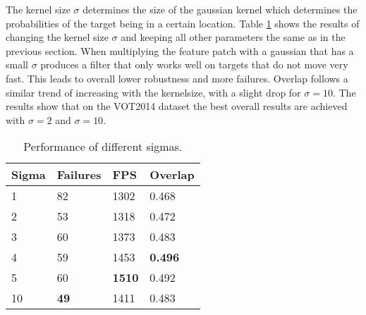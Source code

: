 \documentclass[9pt]{IEEEtran}
\begin{document}
The kernel size $\sigma$ determines the size of the gaussian kernel which determines the probabilities of the target being in a certain location.
Table \ref*{label:sigma} shows the results of changing the kernel size $\sigma$ and keeping all other parameters the same as in the previous section.
When multiplying the feature patch with a gaussian that has a small $\sigma$  produces a filter that only works well on targets that do not move very fast.
This leads to overall lower robustness and more failures.
Overlap follows a similar trend of increasing with the kernelsize, with a slight drop for $\sigma = 10$.
The results show that on the VOT2014 dataset the best overall results are achieved with $\sigma = 2$ and $\sigma = 10$.
\begin{table}[!ht]
    \centering
    \begin{tabular}{llll}
        \textbf{Sigma} & \textbf{Failures} & \textbf{FPS} & \textbf{Overlap} \\ \hline
        1 & 82 & 1302 & 0.468 \\ 
        2 & 53 & 1318 & 0.472 \\ 
        3 & 60 & 1373 & 0.483 \\ 
        4 & 59 & 1453 & \textbf{0.496} \\ 
        5 & 60 & \textbf{1510} & 0.492 \\ 
        10 & \textbf{49} & 1411 & 0.483 \\ \hline
    \end{tabular}
    \caption{Performance of different sigmas.}
    \label{label:sigma}
\end{table}
\end{document}
